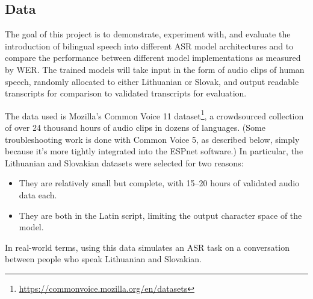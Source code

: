 \documentclass{article}
\begin{document}
  \subsection{Data} \label{data}
  The goal of this project is to demonstrate, experiment with, and evaluate the introduction of bilingual speech into different ASR model architectures and to compare the performance between different model implementations as measured by WER. The trained models will take input in the form of audio clips of human speech, randomly allocated to either Lithuanian or Slovak, and output readable transcripts for comparison to validated transcripts for evaluation.

  The data used is Mozilla's Common Voice 11 dataset\footnote{\url{https://commonvoice.mozilla.org/en/datasets}}, a crowdsourced collection of over 24 thousand hours of audio clips in dozens of languages. (Some troubleshooting work is done with Common Voice 5, as described below, simply because it's more tightly integrated into the ESPnet software.) In particular, the Lithuanian and Slovakian datasets were selected for two reasons:
  \begin{itemize}
    \item They are relatively small but complete, with 15--20 hours of validated audio data each.
    \item They are both in the Latin script, limiting the output character space of the model.
  \end{itemize}
  In real-world terms, using this data simulates an ASR task on a conversation between people who speak Lithuanian and Slovakian.
\end{document}
